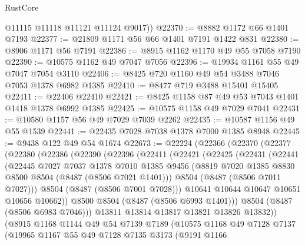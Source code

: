 \begin{lexlean}{RustCore}
\begin{coremodule}
        @11115
        @11118
        @11121
        @11124
        @9017))
@22370 := @8882 @1172 @66 @1401 @7193
@22377 := @21809 @1171 @56 @66 @1401 @7191 @1422 @831
@22380 := @8906 @1171 @56 @7191
@22386 := @8915 @1162 @1170 @49 @55 @7058 @7190
@22390 := @10575 @1162 @49 @7047 @7056
@22396 := @19934 @1161 @55 @49 @7047 @7054 @3110
@22406 := @8425 @720 @1160 @49 @54 @3488 @7046 @7053 @1378 @6982 @1385
@22410 := @8477 @719 @3488 @15401 @15405
@22411 := @22406 @22410
@22421 := @8425 @1158 @87 @49 @53 @7043 @1401 @1418 @1378 @6992 @1385
@22425 := @10575 @1158 @49 @7029 @7041
@22431 := @10580 @1157 @56 @49 @7029 @7039 @2262
@22435 := @10587 @1156 @49 @55 @1539
@22441 := @22435 @7028 @7038 @1378 @7000 @1385 @8948
@22445 := @9438 @122 @49 @54 @1674
@22673 := @22224
    (@22366
      (@22370
        (@22377
          (@22380
            (@22386
              (@22390
                (@22396
                  (@22411
                    (@22421
                      (@22425
                        (@22431
                          (@22441
                            (@22445
                              @7027
                              @7037
                              @1378
                              @7010
                              @1385
                              @9456
                              (@8819 @7020 @1385 @8830 @8500 @8504 (@8487 (@8506 @7021 @1401)))
                              @8504
                              (@8487 (@8506 @7011 @7027)))
                            @8504
                            (@8487 (@8506 @7001 @7028)))
                          @10641
                          @10644
                          @10647
                          @10651
                          @10656
                          @10662))
                      @8500
                      @8504
                      (@8487 (@8506 @6993 @1401)))
                    @8504
                    (@8487 (@8506 @6983 @7046)))
                  @13811
                  @13814
                  @13817
                  @13821
                  @13826
                  @13832))
              (@8915
                @1168
                @1144
                @49
                @54
                @7139
                @7189
                (@10575
                  @1168
                  @49
                  @7128
                  @7137
                  (@19965
                    @1167
                    @55
                    @49
                    @7128
                    @7135
                    @3173
                    (@9191
                      @1166

\end{coremodule}
\end{lexlean}
